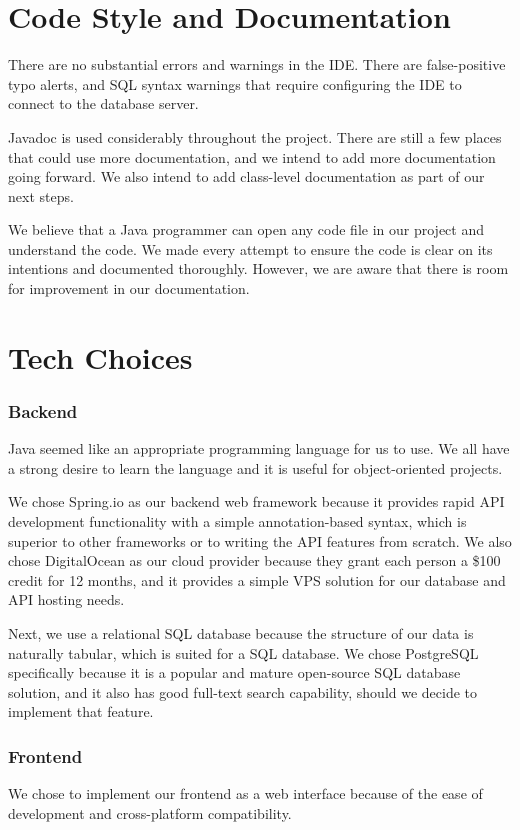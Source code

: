 \documentclass[fontsize=14pt]{article}
\begin{document}
\section*{Code Style and Documentation}

There are no substantial errors and warnings in the IDE. There are false-positive typo alerts, and SQL syntax warnings that require configuring the IDE to connect to the database server.

Javadoc is used considerably throughout the project. There are still a few places that could use more documentation, and we intend to add more documentation going forward. We also intend to add class-level documentation as part of our next steps.

We believe that a Java programmer can open any code file in our project and understand the code. We made every attempt to ensure the code is clear on its intentions and documented thoroughly. However, we are aware that there is room for improvement in our documentation.

\section*{Tech Choices} 
\subsubsection*{Backend}
Java seemed like an appropriate programming language for us to use. We all have a strong desire to learn the language and it is useful for object-oriented projects.

We chose Spring.io as our backend web framework because it provides rapid API development functionality with a simple annotation-based syntax, which is superior to other frameworks or to writing the API features from scratch. We also chose DigitalOcean as our cloud provider because they grant each person a \$100 credit for 12 months, and it provides a simple VPS solution for our database and API hosting needs.

Next, we use a relational SQL database because the structure of our data is naturally tabular, which is suited for a SQL database. We chose PostgreSQL specifically because it is a popular and mature open-source SQL database solution, and it also has good full-text search capability, should we decide to implement that feature.

\subsubsection*{Frontend}
We chose to implement our frontend as a web interface because of the ease of development and cross-platform compatibility. 
\end{document}
